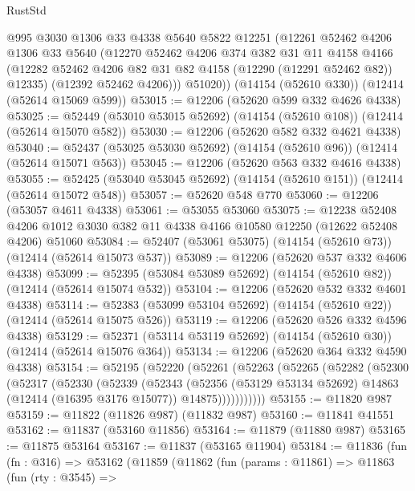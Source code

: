 \begin{lexlean}{RustStd}
\begin{coremodule}
{\begin{coremodule}
{{{{{{{{{{{{{{{{{{{{{{{{{{{{{{{{{{{{{{{{{{{{{{{{{{        @995
        @3030
        @1306
        @33
        @4338
        @5640
        @5822
        @12251
        (@12261
          @52462
          @4206
          @1306
          @33
          @5640
          (@12270
            @52462
            @4206
            @374
            @382
            @31
            @11
            @4158
            @4166
            (@12282 @52462 @4206 @82 @31 @82 @4158 (@12290 (@12291 @52462 @82)) @12335)
            (@12392 @52462 @4206)))
        @51020))
    (@14154 (@52610 @330))
    (@12414 (@52614 @15069 @599))
@53015 := @12206 (@52620 @599 @332 @4626 @4338)
@53025 := @52449 (@53010 @53015 @52692) (@14154 (@52610 @108)) (@12414 (@52614 @15070 @582))
@53030 := @12206 (@52620 @582 @332 @4621 @4338)
@53040 := @52437 (@53025 @53030 @52692) (@14154 (@52610 @96)) (@12414 (@52614 @15071 @563))
@53045 := @12206 (@52620 @563 @332 @4616 @4338)
@53055 := @52425 (@53040 @53045 @52692) (@14154 (@52610 @151)) (@12414 (@52614 @15072 @548))
@53057 := @52620 @548 @770
@53060 := @12206 (@53057 @4611 @4338)
@53061 := @53055 @53060
@53075 := @12238
    @52408
    @4206
    @1012
    @3030
    @382
    @11
    @4338
    @4166
    @10580
    @12250
    (@12622 @52408 @4206)
    @51060
@53084 := @52407 (@53061 @53075) (@14154 (@52610 @73)) (@12414 (@52614 @15073 @537))
@53089 := @12206 (@52620 @537 @332 @4606 @4338)
@53099 := @52395 (@53084 @53089 @52692) (@14154 (@52610 @82)) (@12414 (@52614 @15074 @532))
@53104 := @12206 (@52620 @532 @332 @4601 @4338)
@53114 := @52383 (@53099 @53104 @52692) (@14154 (@52610 @22)) (@12414 (@52614 @15075 @526))
@53119 := @12206 (@52620 @526 @332 @4596 @4338)
@53129 := @52371 (@53114 @53119 @52692) (@14154 (@52610 @30)) (@12414 (@52614 @15076 @364))
@53134 := @12206 (@52620 @364 @332 @4590 @4338)
@53154 := @52195
    (@52220
      (@52261
        (@52263
          (@52265
            (@52282
              (@52300
                (@52317
                  (@52330
                    (@52339
                      (@52343
                        (@52356
                          (@53129 @53134 @52692)
                          @14863
                          (@12414 (@16395 @3176 @15077))
                          @14875)))))))))))
@53155 := @11820 @987
@53159 := @11822 (@11826 @987) (@11832 @987)
@53160 := @11841 @41551
@53162 := @11837 (@53160 @11856)
@53164 := @11879 (@11880 @987)
@53165 := @11875 @53164
@53167 := @11837 (@53165 @11904)
@53184 := @11836
    (fun (fn : @316) =>
    @53162
      (@11859
        (@11862
          (fun (params : @11861) =>
          @11863
            (fun (rty : @3545) =>
}}}}}}}}}}}}}}}}}}}}}}}}}}}}}}}}}}}}}}}}}}}}}}}}}}
\end{coremodule}}
\end{coremodule}
\end{lexlean}
